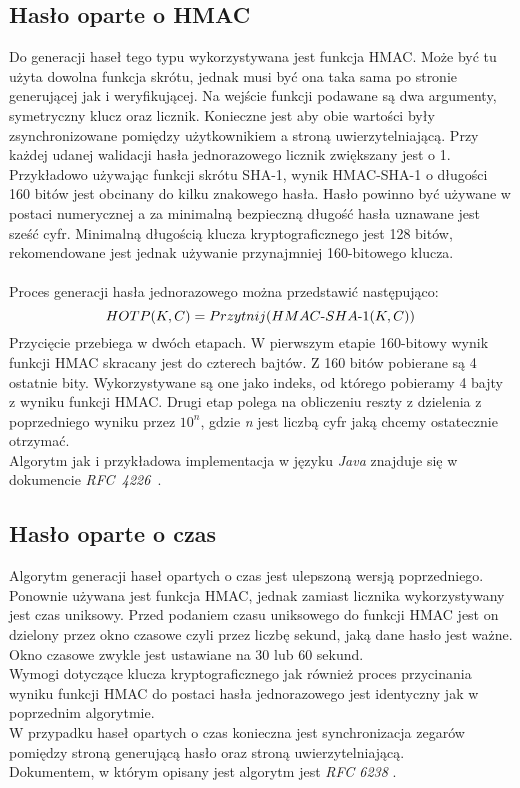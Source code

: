 \subsection{Hasło oparte o HMAC}
Do generacji haseł tego typu wykorzystywana jest funkcja HMAC. Może być tu użyta dowolna funkcja skrótu, jednak 
musi być ona taka sama po stronie generującej jak i weryfikującej. 
Na wejście funkcji podawane są dwa argumenty, symetryczny klucz oraz licznik. 
Konieczne jest aby obie wartości były zsynchronizowane pomiędzy użytkownikiem a stroną uwierzytelniającą. 
Przy każdej udanej walidacji hasła jednorazowego licznik zwiększany jest o 1. \\
Przykładowo używając funkcji skrótu SHA-1, wynik HMAC-SHA-1 o długości 160 bitów jest obcinany do kilku znakowego hasła. 
Hasło powinno być używane w postaci numerycznej a za minimalną bezpieczną długość hasła uznawane jest sześć cyfr.
Minimalną długością klucza kryptograficznego jest 128 bitów, rekomendowane jest jednak używanie przynajmniej 160-bitowego 
klucza. \\ \\
Proces generacji hasła jednorazowego można przedstawić następująco: \\
$$HOTP(K, C) = Przytnij(\mathop{\mbox{$HMAC$-$SHA$-$1$}}(K, C))$$
Przycięcie przebiega w dwóch etapach. W pierwszym etapie 160-bitowy wynik funkcji HMAC skracany jest do czterech bajtów.
Z 160 bitów pobierane są 4 ostatnie bity. 
Wykorzystywane są one jako indeks, od którego pobieramy 4 bajty z wyniku funkcji HMAC.
Drugi etap polega na obliczeniu reszty z dzielenia z poprzedniego wyniku przez $10^n$, gdzie \textit{n} jest 
liczbą cyfr jaką chcemy ostatecznie otrzymać. \\
Algorytm jak i przykładowa implementacja w języku \textit{Java} znajduje się w dokumencie \textit{RFC~4226}~\cite{hotprfc}.

\subsection{Hasło oparte o czas}
Algorytm generacji haseł opartych o czas jest ulepszoną wersją poprzedniego. 
Ponownie używana jest funkcja HMAC, jednak zamiast licznika wykorzystywany jest czas uniksowy.
Przed podaniem czasu uniksowego do funkcji HMAC jest on dzielony przez okno czasowe czyli 
przez liczbę sekund, jaką dane hasło jest ważne. 
Okno czasowe zwykle jest ustawiane na 30 lub 60 sekund. \\
Wymogi dotyczące klucza kryptograficznego jak również proces przycinania wyniku funkcji HMAC 
do postaci hasła jednorazowego jest identyczny jak w poprzednim algorytmie. \\
W przypadku haseł opartych o czas konieczna jest synchronizacja zegarów pomiędzy stroną generującą hasło
oraz stroną uwierzytelniającą. \\
Dokumentem, w którym opisany jest algorytm jest \textit{RFC 6238} \cite{totprfc}.

